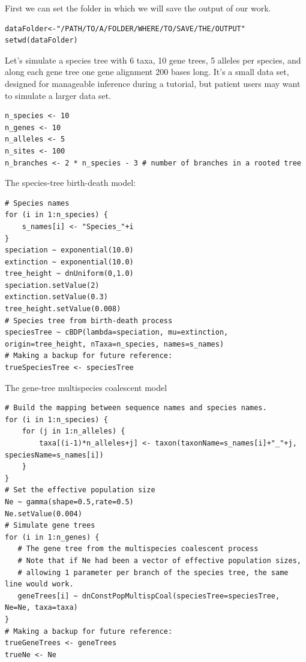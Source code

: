 \documentclass[11pt]{article}
\begin{document}
{\begin{framed}
First we can set the folder in which we will save the output of our work.
 {\tt \begin{snugshade*}
\begin{lstlisting}
dataFolder<-"/PATH/TO/A/FOLDER/WHERE/TO/SAVE/THE/OUTPUT"
setwd(dataFolder)
\end{lstlisting}
\end{snugshade*}}

Let's simulate a species tree with 6 taxa, 10 gene trees, 5 alleles per species, and along each gene tree one gene alignment 200 bases long.
It's a small data set, designed for manageable inference during a tutorial, but patient users may want to simulate a larger data set.

 {\tt \begin{snugshade*}
\begin{lstlisting}
n_species <- 10
n_genes <- 10
n_alleles <- 5
n_sites <- 100
n_branches <- 2 * n_species - 3 # number of branches in a rooted tree
\end{lstlisting}
\end{snugshade*}}

The species-tree birth-death model:

 {\tt \begin{snugshade*}
\begin{lstlisting}
# Species names
for (i in 1:n_species) {
	s_names[i] <- "Species_"+i
}
speciation ~ exponential(10.0)
extinction ~ exponential(10.0)
tree_height ~ dnUniform(0,1.0)
speciation.setValue(2)
extinction.setValue(0.3)
tree_height.setValue(0.008)
# Species tree from birth-death process
speciesTree ~ cBDP(lambda=speciation, mu=extinction, origin=tree_height, nTaxa=n_species, names=s_names)
# Making a backup for future reference:
trueSpeciesTree <- speciesTree
\end{lstlisting}
\end{snugshade*}}

The gene-tree multispecies coalescent model
 {\tt \begin{snugshade*}
\begin{lstlisting}
# Build the mapping between sequence names and species names.
for (i in 1:n_species) {
	for (j in 1:n_alleles) {
		taxa[(i-1)*n_alleles+j] <- taxon(taxonName=s_names[i]+"_"+j, speciesName=s_names[i])
	}
}
# Set the effective population size
Ne ~ gamma(shape=0.5,rate=0.5)
Ne.setValue(0.004)
# Simulate gene trees
for (i in 1:n_genes) {
   # The gene tree from the multispecies coalescent process
   # Note that if Ne had been a vector of effective population sizes, 
   # allowing 1 parameter per branch of the species tree, the same line would work.
   geneTrees[i] ~ dnConstPopMultispCoal(speciesTree=speciesTree, Ne=Ne, taxa=taxa)
}
# Making a backup for future reference:
trueGeneTrees <- geneTrees
trueNe <- Ne
\end{lstlisting}
\end{snugshade*}}


\end{framed}}
\end{document}
